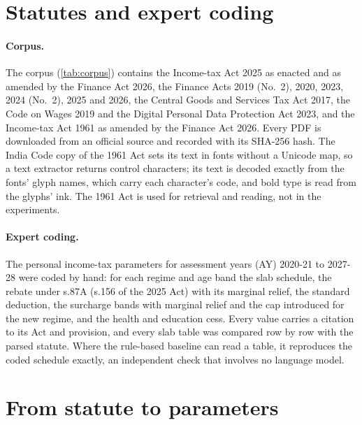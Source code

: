 \documentclass[sn-apa]{sn-jnl}
\begin{document}
\section{Statutes and expert coding}\label{sec:data}

\paragraph{Corpus.} The corpus (\cref{tab:corpus}) contains the Income-tax
Act 2025 as enacted and as amended by the Finance Act 2026, the Finance Acts
2019 (No.~2), 2020, 2023, 2024 (No.~2), 2025 and 2026, the Central Goods and
Services Tax Act 2017, the Code on Wages 2019 and the Digital Personal Data
Protection Act 2023, and the Income-tax Act 1961 as amended by the Finance
Act 2026. Every PDF is downloaded from an official source and recorded with
its SHA-256 hash. The India Code copy of the 1961 Act sets its text in fonts
without a Unicode map, so a text extractor returns control characters; its
text is decoded exactly from the fonts' glyph names, which carry each
character's code, and bold type is read from the glyphs' ink. The 1961 Act is
used for retrieval and reading, not in the experiments.



\paragraph{Expert coding.} The personal income-tax parameters for assessment
years (AY) 2020-21 to 2027-28 were coded by hand: for each regime and age
band the slab schedule, the rebate under s.87A (s.156 of the 2025 Act) with
its marginal relief, the standard deduction, the surcharge bands with
marginal relief and the cap introduced for the new regime, and the health and
education cess. Every value carries a citation to its Act and provision, and
every slab table was compared row by row with the parsed statute. Where the
rule-based baseline can read a table, it reproduces the coded schedule
exactly, an independent check that involves no language model.

\section{From statute to parameters}\label{sec:pipeline}
\end{document}
